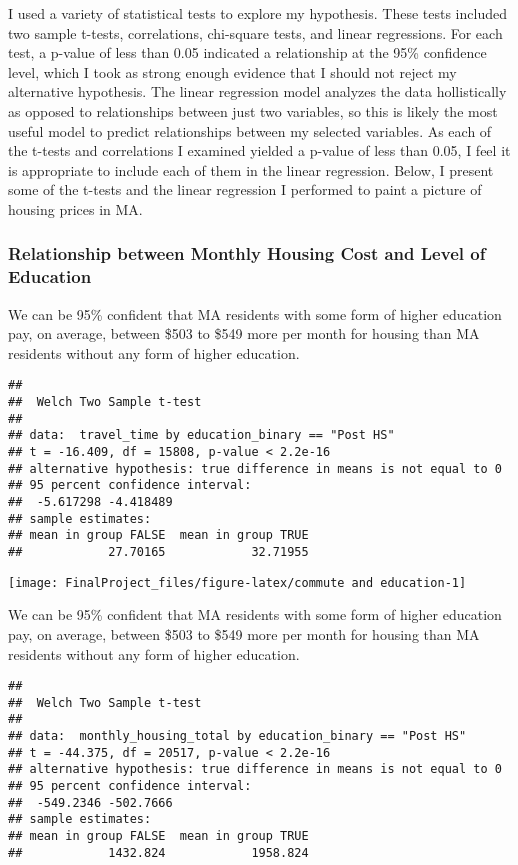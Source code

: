 \documentclass[
]{article}
\begin{document}
I used a variety of statistical tests to explore my hypothesis. These
tests included two sample t-tests, correlations, chi-square tests, and
linear regressions. For each test, a p-value of less than 0.05 indicated
a relationship at the 95\% confidence level, which I took as strong
enough evidence that I should not reject my alternative hypothesis. The
linear regression model analyzes the data hollistically as opposed to
relationships between just two variables, so this is likely the most
useful model to predict relationships between my selected variables. As
each of the t-tests and correlations I examined yielded a p-value of
less than 0.05, I feel it is appropriate to include each of them in the
linear regression. Below, I present some of the t-tests and the linear
regression I performed to paint a picture of housing prices in MA.

\hypertarget{relationship-between-monthly-housing-cost-and-level-of-education}{%
\subsubsection{Relationship between Monthly Housing Cost and Level of
Education}\label{relationship-between-monthly-housing-cost-and-level-of-education}}

We can be 95\% confident that MA residents with some form of higher
education pay, on average, between \$503 to \$549 more per month for
housing than MA residents without any form of higher education.

\begin{verbatim}
## 
##  Welch Two Sample t-test
## 
## data:  travel_time by education_binary == "Post HS"
## t = -16.409, df = 15808, p-value < 2.2e-16
## alternative hypothesis: true difference in means is not equal to 0
## 95 percent confidence interval:
##  -5.617298 -4.418489
## sample estimates:
## mean in group FALSE  mean in group TRUE 
##            27.70165            32.71955
\end{verbatim}

\begin{center}\texttt{[image: FinalProject\_files/figure-latex/commute and education-1]} \end{center}

We can be 95\% confident that MA residents with some form of higher
education pay, on average, between \$503 to \$549 more per month for
housing than MA residents without any form of higher education.

\begin{verbatim}
## 
##  Welch Two Sample t-test
## 
## data:  monthly_housing_total by education_binary == "Post HS"
## t = -44.375, df = 20517, p-value < 2.2e-16
## alternative hypothesis: true difference in means is not equal to 0
## 95 percent confidence interval:
##  -549.2346 -502.7666
## sample estimates:
## mean in group FALSE  mean in group TRUE 
##            1432.824            1958.824
\end{verbatim}
\end{document}
